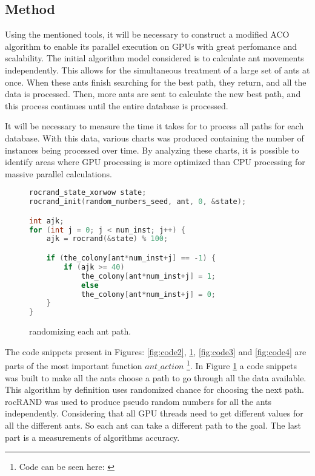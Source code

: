 \subsection{Method} \label{Method}

Using the mentioned tools, it will be necessary to construct a modified ACO algorithm to enable its
parallel execution on GPUs with great perfomance and scalability. The initial algorithm model
considered is to calculate ant movements independently. This allows for the simultaneous treatment
of a large set of ants at once. When these ants finish searching for the best path, they return,
and all the data is processed. Then, more ants are sent to calculate the new best path, and this
process continues until the entire database is processed.

It will be necessary to measure the time it takes for to process all paths for each database.
With this data, various charts was produced containing the number of instances being processed
over time. By analyzing these charts, it is possible to identify areas where GPU
processing is more optimized than CPU processing for massive parallel calculations.

\begin{figure}[h!]
\begin{lstlisting}[language=c++]
rocrand_state_xorwow state;
rocrand_init(random_numbers_seed, ant, 0, &state);

int ajk;
for (int j = 0; j < num_inst; j++) {
    ajk = rocrand(&state) % 100;

    if (the_colony[ant*num_inst+j] == -1) {
        if (ajk >= 40)
            the_colony[ant*num_inst+j] = 1;
            else
            the_colony[ant*num_inst+j] = 0;
    }
}
\end{lstlisting}
\caption{randomizing each ant path.}
\label{fig:code1}
\end{figure}

The code snippets present in Figures: \ref{fig:code2}, \ref{fig:code1}, \ref{fig:code3} and \ref{fig:code4} are parts of the most important function $ant\_action$ \footnote{Code can be seen here: \cite{santiagoParallelAco}}.
In Figure \ref{fig:code1} a code snippets was built to make all the ants choose a path to go through all the data available.
This algorithm by definition uses randomized chance for choosing the next path.
rocRAND \cite{rocrand} was used to produce pseudo random numbers for all the ants independently.
Considering that all GPU threads need to get different values for all the different ants. So each ant
can take a different path to the goal. The last part is a measurements of algorithms accuracy.

